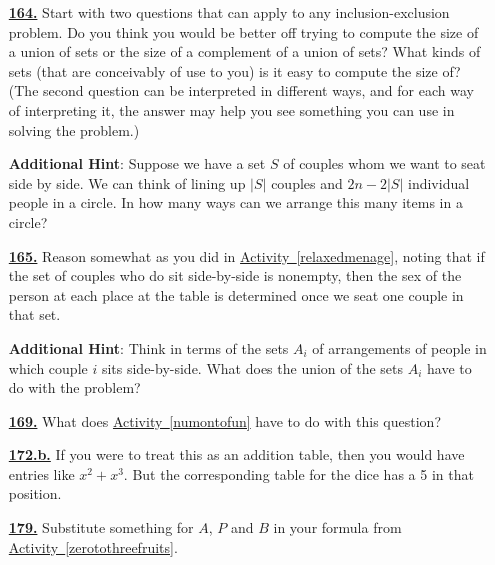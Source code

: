 \documentclass[10pt,]{book}
\theoremstyle{plain}
\theoremstyle{definition}
\theoremstyle{definition}
\theoremstyle{definition}
\numberwithin{equation}{chapter}
\begin{document}
\begin{itemize}[itemsep=1em]
\hypertarget{a-164}{}\item[\textbf{\hyperref[relaxedmenage]{164.}}]
\hypertarget{p-793}{}%
Start with two questions that can apply to any inclusion-exclusion problem. Do you think you would be better off trying to compute the size of a union of sets or the size of a complement of a union of sets? What kinds of sets (that are conceivably of use to you) is it easy to compute the size of? (The second question can be interpreted in different ways, and for each way of interpreting it, the answer may help you see something you can use in solving the problem.)%

\par\smallskip
\noindent\textbf{Additional Hint}: \hypertarget{p-794}{}%
Suppose we have a set \(S\) of couples whom we want to seat side by side. We can think of lining up \(|S|\) couples and \(2n - 2|S|\) individual people in a circle.  In how many ways can we arrange this many items in a circle?%

\hypertarget{a-165}{}\item[\textbf{\hyperref[activity-165]{165.}}]
\hypertarget{p-797}{}%
Reason somewhat as you did in \hyperref[relaxedmenage]{Activity~\ref{relaxedmenage}}, noting that if the set of couples who do sit side-by-side is nonempty, then the sex of the person at each place at the table is determined once we seat one couple in that set.%

\par\smallskip
\noindent\textbf{Additional Hint}: \hypertarget{p-798}{}%
Think in terms of the sets \(A_i\) of arrangements of people in which couple \(i\) sits side-by-side. What does the union of the sets \(A_i\) have to do with the problem?%

\hypertarget{a-169}{}\item[\textbf{\hyperref[act_stirlingpie]{169.}}]
\hypertarget{p-813}{}%
What does \hyperref[numontofun]{Activity~\ref{numontofun}} have to do with this question?%

\hypertarget{a-172.b}{}\item[\textbf{\hyperref[task-168]{172.b.}}]
\hypertarget{p-830}{}%
If you were to treat this as an addition table, then you would have entries like \(x^2+x^3\).  But the corresponding table for the dice has a 5 in that position.%

\hypertarget{a-179}{}\item[\textbf{\hyperref[activity-179]{179.}}]
\hypertarget{p-854}{}%
Substitute something for \(A\), \(P\) and \(B\) in your formula from \hyperref[zerotothreefruits]{Activity~\ref{zerotothreefruits}}.%


\end{itemize}
\end{document}
